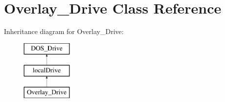 \hypertarget{classOverlay__Drive}{\section{Overlay\-\_\-\-Drive Class Reference}
\label{classOverlay__Drive}
}
Inheritance diagram for Overlay\-\_\-\-Drive\-:\begin{figure}[H]
\begin{center}
\leavevmode
\includegraphics[height=3.000000cm]{classOverlay__Drive}
\end{center}
\end{figure}

